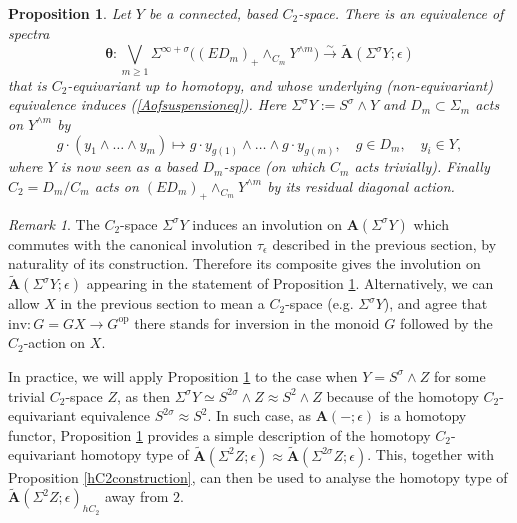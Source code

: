 \documentclass[a4paper, oneside]{amsart}
\newcommand{\1}{\mathds{1}}
\newtheorem{prop}[thm]{Proposition}
\theoremstyle{remark}
\newtheorem{rem}[thm]{Remark}%
\theoremstyle{definition}
\newcommand{\Asp}{\mathbf{A}}
\numberwithin{equation}{section}
\begin{document}
\begin{prop}\label{Aofsuspensionprop}
    Let $Y$ be a connected, based $C_2$-space. There is an equivalence of spectra
    $$
\boldsymbol{\theta}: \bigvee_{m\geq 1} \Sigma^{\infty+\sigma}\big((ED_m)_+\wedge_{C_m} Y^{\wedge m}\big)\overset{\sim}\longrightarrow \widetilde{\Asp}(\Sigma^{\sigma} Y;\epsilon)
    $$
    that is $C_2$-equivariant up to homotopy, and whose underlying (non-equivariant) equivalence induces (\ref{Aofsuspensioneq}). Here $\Sigma^\sigma Y:=S^\sigma\wedge Y$ and $D_m\subset \Sigma_m$ acts on $Y^{\wedge m}$ by 
    $$
g\cdot(y_1\wedge \dots\wedge y_m)\longmapsto g\cdot y_{g(1)}\wedge\dots \wedge g\cdot y_{g(m)}, \quad g\in D_m, \quad y_i\in Y,
    $$
    where $Y$ is now seen as a based $D_m$-space (on which $C_m$ acts trivially). Finally $C_2=D_m/C_m$ acts on $(ED_m)_+\wedge_{C_m} Y^{\wedge m}$ by its residual diagonal action.  
\end{prop}


\begin{rem}
    The $C_2$-space $\Sigma^{\sigma}Y$ induces an involution on $\Asp(\Sigma^\sigma Y)$ which commutes with the canonical involution $\tau_\epsilon$ described in the previous section, by naturality of its construction. Therefore its composite gives the involution on $\widetilde{\Asp}(\Sigma^\sigma Y;\epsilon)$ appearing in the statement of Proposition \ref{Aofsuspensionprop}. Alternatively, we can allow $X$ in the previous section to mean a $C_2$-space (e.g. $\Sigma^\sigma Y$), and agree that $\mathrm{inv}: G=GX\to G^{\mathrm{op}}$ there stands for inversion in the monoid $G$ followed by the $C_2$-action on $X$.

    In practice, we will apply Proposition \ref{Aofsuspensionprop} to the case when $Y=S^\sigma\wedge Z$ for some trivial $C_2$-space $Z$, as then $\Sigma^\sigma Y\simeq S^{2\sigma}\wedge Z\approx S^2\wedge Z$ because of the homotopy $C_2$-equivariant equivalence $S^{2\sigma}\approx S^2$. In such case, as $\Asp(-;\epsilon)$ is a homotopy functor, Proposition \ref{Aofsuspensionprop} provides a simple description of the homotopy $C_2$-equivariant homotopy type of $\widetilde{\Asp}(\Sigma^2Z;\epsilon)\approx \widetilde{\Asp}(\Sigma^{2\sigma}Z;\epsilon)$. This, together with Proposition \ref{hC2construction}, can then be used to analyse the homotopy type of $\widetilde{\Asp}(\Sigma^2Z;\epsilon)_{hC_2}$ away from $2$.
\end{rem}
\end{document}
